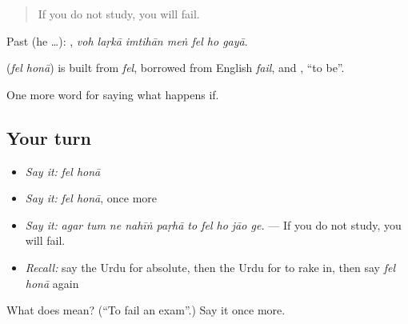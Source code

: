 \begin{quote}
If you do not study, you will fail.
\end{quote}

Past (he …):       , \emph{voh laṛkā imtihān meṅ fel ho gayā}.

\begin{cousinweb}
\textbf{ } (\emph{fel honā}) is built from \emph{fel}, borrowed from English \emph{fail}, and \textbf{}, \textquotedblleft{}to be\textquotedblright{}.
\end{cousinweb}

\begin{grammarlens}[title={What you've built}]
One more word for saying what happens if.
\end{grammarlens}

\subsection*{Your turn}
\begin{itemize}
\raggedright
  \item \emph{Say it:} \emph{fel honā}
  \item \emph{Say it:} \emph{fel honā}, once more
  \item \emph{Say it:} \emph{agar tum ne nahīṅ paṛhā to fel ho jāo ge.} — If you do not study, you will fail.
  \item \emph{Recall:} say the Urdu for absolute, then the Urdu for to rake in, then say \emph{fel honā} again
\end{itemize}

\begin{tcolorbox}[breakable,colback=teal!4,colframe=teal!35!black,title={Before you move on}]
What does   mean? (\textquotedblleft{}To fail an exam\textquotedblright{}.) Say it once more.
\end{tcolorbox}
